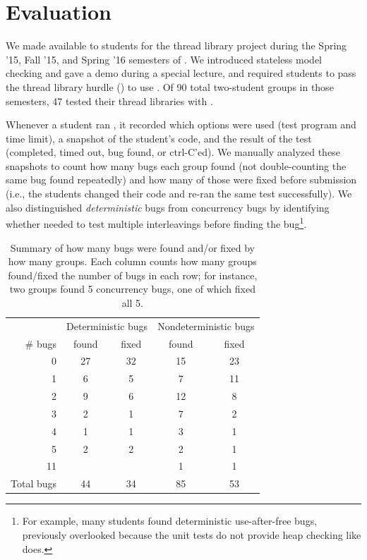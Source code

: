 \section{Evaluation}
\label{sec:eval}

We made \landslide available to students for the thread library project
during the Spring '15, Fall '15, and Spring '16 semesters of \fourten.
We introduced stateless model checking and gave a demo during a special lecture,
and required students to pass the thread library hurdle (\sect{\ref{sec:grading}}) to use \landslide.
Of 90 total two-student groups in those semesters, 47 tested their thread libraries with \landslide.

Whenever a student ran \landslide,
it recorded which options were used (test program and time limit),
a snapshot of the student's code,
and the result of the test (completed, timed out, bug found, or ctrl-C'ed).
%
We manually analyzed these snapshots to count how many bugs each group found
(not double-counting the same bug found repeatedly)
and how many of those were fixed before submission
(i.e., the students changed their code and re-ran the same test successfully).
%
We also distinguished {\em deterministic} bugs from concurrency bugs
by identifying whether \landslide needed to test multiple interleavings before finding the bug\footnote{
	For example, many students found deterministic use-after-free bugs,
	previously overlooked because the unit tests do not provide heap checking like \landslide does.
}.

\begin{table}[t]
	\begin{tabular}{r|cc|cc}
	& \multicolumn{2}{c|}{Deterministic bugs} & \multicolumn{2}{c}{Nondeterministic bugs} \\
	\# bugs	& found & fixed & found & fixed \\
	\hline
	0	& 27	& 32	& 15	& 23	\\
	1	& 6	& 5	& 7	& 11	\\
	2	& 9	& 6	& 12	& 8	\\
	3	& 2	& 1	& 7	& 2	\\
	4	& 1	& 1	& 3	& 1	\\
	5	& 2	& 2	& 2	& 1	\\
	11	& 	& 	& 1	& 1	\\
	\hline
	Total bugs
		& 44	& 34	& 85	& 53	\\
	\end{tabular}
	\caption{Summary of how many bugs were found and/or fixed by how many groups.
	Each column counts how many groups found/fixed the number of bugs in each row;
	for instance, two groups found 5 concurrency bugs, one of which fixed all 5.}
	\label{tab:this-table-sucks-but-it's-the-best-i-got}
\end{table}

